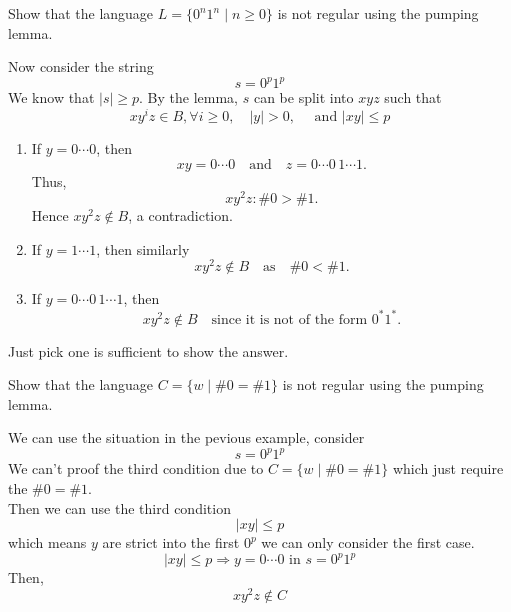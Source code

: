 \begin{exercise}
    Show that the language $L = \{0^n 1^n \mid n \geq 0\}$ is not regular using the pumping lemma.
\end{exercise}
\begin{answer}
    Now consider the string 
    \[
        s = 0^p1^p
    \]
    We know that $|s| \geq p$. By the lemma, $s$ can be split into $xyz$ such that
    \[
    xy^i z \in B, \forall i \geq 0, \quad |y| > 0, \quad \text{ and } |xy| \leq p
    \]

    \begin{enumerate}[label=$\arabic*^\circ$]
    \item If 
    \(
        y = 0 \cdots 0
    \),
    then
    \[
        xy = 0 \cdots 0 
        \quad\text{and}\quad 
        z = 0 \cdots 0\, 1 \cdots 1.
    \]
    Thus,
    \[
        xy^2 z : \#0 > \#1.
    \]
    Hence \( xy^2 z \notin B \), a contradiction.

    \item If 
    \(
        y = 1 \cdots 1
    \),
    then similarly
    \[
        xy^2 z \notin B 
        \quad\text{as}\quad 
        \#0 < \#1.
    \]

    \item If 
    \(
        y = 0 \cdots 0\, 1 \cdots 1
    \),
    then
    \[
        xy^2 z \notin B 
        \quad\text{since it is not of the form } 0^*1^*.
    \]
\end{enumerate}

\begin{note}
    Just pick one is sufficient to show the answer.
\end{note}

\end{answer}


\begin{exercise}
    Show that the language $C = \{w \mid \#0 = \#1\}$ is not regular using the pumping lemma.
\end{exercise}
\begin{answer}
    We can use the situation in the pevious example, consider \[
        s = 0^p1^p
    \]
    We can't proof the third condition due to $C = \{w \mid \#0 = \#1\}$ which just require the $\#0 = \#1$. \\
    Then we can use the third condition
    \[
        |xy| \leq p
    \]
    which means $y$ are strict into the first $0^p$ we can only consider the first case.
    \[
        |xy| \leq p \Rightarrow y = 0 \cdots 0 \text{ in } s = 0^p 1^p
    \]
    Then, 
    \[
        xy^2 z \notin C
    \]
\end{answer}

